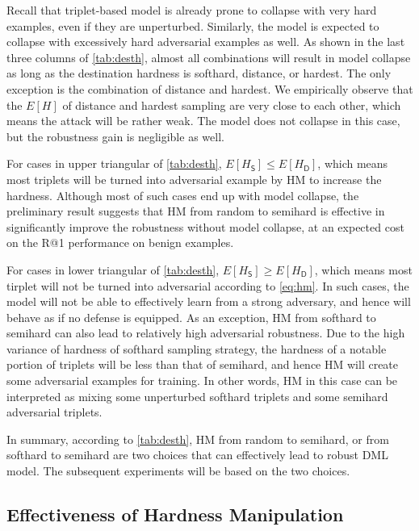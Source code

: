 \documentclass[10pt,twocolumn,letterpaper]{article}
\begin{document}

Recall that triplet-based model is already prone to collapse with very hard
examples, even if they are unperturbed.
%
Similarly, the model is expected to collapse with excessively hard adversarial
examples as well.
%
As shown in the last three columns of \cref{tab:desth}, almost all combinations
will result in model collapse as long as the destination hardness is softhard,
distance, or hardest.
%
The only exception is the combination of distance and hardest.
%
We empirically observe that the $E[H]$ of distance and hardest sampling are
very close to each other, which means the attack will be rather weak.
%
The model does not collapse in this case, but the robustness gain is negligible
as well.


For cases in upper triangular of \cref{tab:desth}, $E[H_\mathsf{S}] \leqslant E[H_\mathsf{D}]$,
which means most triplets will be turned into adversarial example by HM
to increase the hardness.
%
Although most of such cases end up with model collapse, the preliminary 
result suggests that HM from random to semihard is effective in significantly
improve the robustness without model collapse, at an expected cost on the R@1
performance on benign examples.

For cases in lower triangular of \cref{tab:desth}, $E[H_\mathsf{S}] \geqslant E[H_\mathsf{D}]$,
which means most tirplet will not be turned into adversarial according to
\cref{eq:hm}.
%
In such cases, the model will not be able to effectively learn from a strong
adversary, and hence will behave as if no defense is equipped.
%
As an exception, HM from softhard to semihard can also lead to relatively high
adversarial robustness.
%
Due to the high variance of hardness of softhard sampling strategy, the
hardness of a notable portion of triplets will be less than that of semihard,
and hence HM will create some adversarial examples for training.
%
In other words, HM in this case can be interpreted as mixing some unperturbed
softhard triplets and some semihard adversarial triplets.


In summary, according to \cref{tab:desth}, HM from random to semihard, or from
softhard to semihard are two choices that can effectively lead to robust
DML model.
%
The subsequent experiments will be based on the two choices.

\subsection{Effectiveness of Hardness Manipulation}
\label{sec:42}
\end{document}
